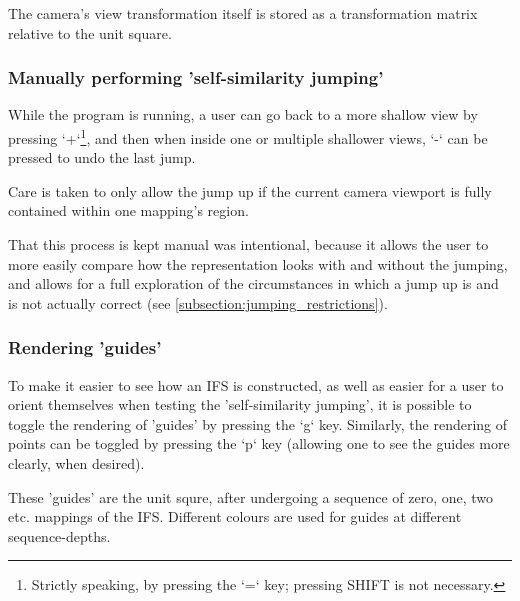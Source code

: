 \documentclass[11pt]{article}
\begin{document}
The camera's view transformation itself is stored as a transformation matrix relative to the unit square.

\subsubsection{Manually performing 'self-similarity jumping'}
\label{sec:org503fd53}

While the program is running, a user can go back to a more shallow view by pressing `+`\footnote{Strictly speaking, by pressing the `=` key; pressing SHIFT is not necessary.}, and then when inside one or multiple shallower views,
`-` can be pressed to undo the last jump.

Care is taken to only allow the jump up if the current camera viewport is fully contained within one mapping's region.

That this process is kept manual was intentional, because it allows the user to more easily compare how
the representation looks with and without the jumping, and allows for a full exploration of the circumstances
in which a jump up is and is not actually correct (see \autoref{subsection:jumping_restrictions}).
\subsubsection{Rendering 'guides'}
\label{sec:org302e9d4}

To make it easier to see how an IFS is constructed, as well as easier for a user to orient themselves when
testing the 'self-similarity jumping', it is possible to toggle the rendering of 'guides' by pressing the `g` key.
Similarly, the rendering of points can be toggled by pressing the `p` key (allowing one to see the guides more clearly, when desired).

These 'guides' are the unit squre, after undergoing a sequence of zero, one, two etc. mappings of the IFS.
Different colours are used for guides at different sequence-depths.
\end{document}
